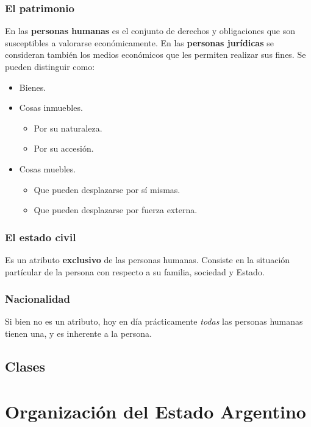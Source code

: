 \documentclass[../main.tex]{subfiles}
\begin{document}
\subsubsection{El patrimonio}

En las \textbf{personas humanas} es el conjunto de derechos y obligaciones que son susceptibles
a valorarse económicamente. En las \textbf{personas jurídicas} se consideran
también los medios económicos que les permiten realizar sus fines. Se pueden
distinguir como:

\begin{itemize}
  \item Bienes.
  \item Cosas inmuebles.
    \begin{itemize}
      \item Por su naturaleza.
      \item Por su accesión.
    \end{itemize}
  \item Cosas muebles.
      \begin{itemize}
        \item   Que pueden desplazarse por sí mismas.
        \item Que pueden desplazarse por fuerza externa.
      \end{itemize}
\end{itemize}

\subsubsection{El estado civil}

Es un atributo \textbf{exclusivo} de las personas humanas. Consiste en la situación
partícular de la persona con respecto a su familia, sociedad y Estado.

\subsubsection{Nacionalidad}

Si bien no es un atributo, hoy en día prácticamente \textit{todas} las personas
humanas tienen una, y es inherente a la persona.

\subsection{Clases}


\section{Organización del Estado Argentino}
\end{document}
